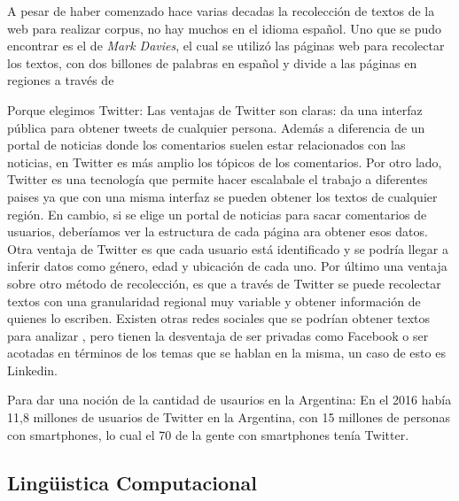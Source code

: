 A pesar de haber comenzado hace varias decadas la recolección de textos de la web para realizar corpus, no hay muchos en el idioma español.
Uno que se pudo encontrar es el de \textit{Mark Davies}, el cual se utilizó las páginas web para recolectar los textos, con dos billones de palabras en español y divide a las páginas en regiones a través de  

Porque elegimos Twitter:
Las ventajas de Twitter son claras: da una interfaz pública para obtener tweets de cualquier persona. Además a diferencia de un portal de noticias donde los comentarios suelen estar relacionados con las noticias, en Twitter es más amplio los tópicos de los comentarios.
Por otro lado, Twitter es una tecnología que permite hacer escalabale el trabajo a diferentes paises ya que con una misma interfaz se pueden obtener los textos de cualquier región. En cambio, si se elige un portal de noticias para sacar comentarios de usuarios, deberíamos ver la estructura de cada página ara obtener esos datos.
Otra ventaja de Twitter es que cada usuario está identificado y se podría llegar a inferir datos como género, edad y ubicación de cada uno.
Por último una ventaja sobre otro método de recolección, es que a través de Twitter se puede recolectar textos con una granularidad regional muy variable y obtener información de quienes lo escriben.
Existen otras redes sociales que se podrían obtener textos para analizar , pero tienen la desventaja de ser privadas como Facebook o ser acotadas en términos de los temas que se hablan en la misma, un caso de esto es Linkedin. 

Para dar una noción de la cantidad de usaurios en la Argentina:
En el 2016 había 11,8 millones de usuarios de Twitter en la Argentina, con 15 millones de personas con smartphones, lo cual el 70 de la gente con smartphones tenía Twitter.

\subsection{Lingüistica Computacional} %
\label{sub:linguistica_computacional}

